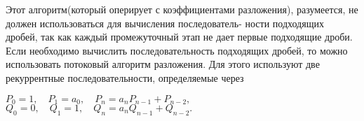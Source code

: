\documentclass{mai_book}
\begin{document}
\noindent Этот алгоритм(который оперирует с коэффициентами разложения),\linebreak
разумеется, не должен использоваться для вычисления последователь-­\linebreak
ности подходящих дробей, так как каждый промежуточный этап не\linebreak
дает первые подходящие дроби.\newline
\hspace*{15pt}Если необходимо вычислить последовательность подходящих дро­бей,\linebreak
то можно использовать потоковый алгоритм разложения. Для это­го \linebreak
используют две рекуррентные последовательности, определяемые через\nolinebreak
\begin{center}
	$P_0=1,\quad P_1=a_0,\quad P_n=a_nP_{n-1}+P_{n-2},$\\
	$Q_0=0,\quad Q_1=1,\quad Q_n=a_nQ_{n-1}+Q_{n-2}.$
\end{center}
\end{document}
